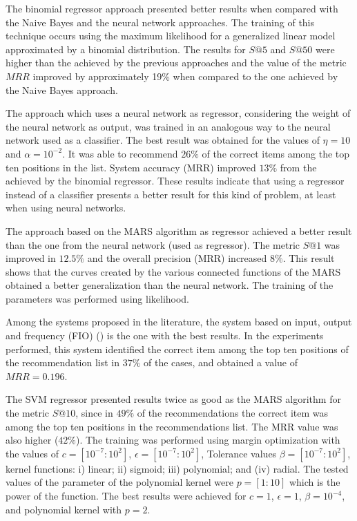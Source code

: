 \documentclass{RITA}
\begin{document}
The binomial regressor approach presented better results when compared with the Naive Bayes and the neural network approaches. The training of this technique occurs using the maximum likelihood for a generalized linear model approximated by a binomial distribution. The results for \(S@5\) and \(S@50\) were higher than the achieved by the previous approaches and the value of the metric \(MRR\) improved by approximately 19\% when compared to the one achieved by the Naive Bayes approach.

The approach which uses a neural network as regressor, considering the weight of the neural network as output, was trained in an analogous way to the neural network used as a classifier. The best result was obtained for the values of \(\eta = 10\) and \(\alpha = 10^{-2}\). It was able to recommend \(26\%\) of the correct items among the top ten positions in the list. System accuracy (MRR) improved \(13\%\) from the achieved by the binomial regressor. These results indicate that using a regressor instead of a classifier presents a better result for this kind of problem, at least when using neural networks.

The approach based on the MARS algorithm as regressor achieved a better result than the one from the neural network (used as regressor). The metric \(S@1\) was improved in \(12.5\%\) and the overall precision (MRR) increased  \(8\%\). This result shows that the curves created by the various connected functions of the MARS obtained a better generalization than the neural network. The training of the parameters was performed using likelihood.

Among the systems proposed in the literature, the system based on input, output and frequency (FIO) (\cite{Wang2008}) is the one with the best results. In the experiments performed, this system identified the correct item among the top ten positions of the recommendation list in \(37\%\) of the cases, and obtained a value of \(MRR = 0.196\).

The SVM regressor presented results twice as good as the MARS algorithm for the metric \(S@10\), since in \(49\%\) of the recommendations the correct item was among the top ten positions in the recommendations list. The MRR value was also higher (\(42\%\)). The training was performed using margin optimization with the values of \(c = [10^{-7}:10^2]\), \(\epsilon = [10^{-7}:10^{2}]\), Tolerance values \(\beta = [10^{-7}:10^{2}]\),  kernel functions: i) linear; ii) sigmoid; iii) polynomial; and (iv) radial. The tested values of the parameter of the polynomial kernel were  \(p = [1:10]\) which is the power of the function. The best results were achieved for \(c = 1\), \(\epsilon = 1\), \(\beta = 10^{-4}\), and polynomial kernel with \(p = 2\). 
\end{document}
